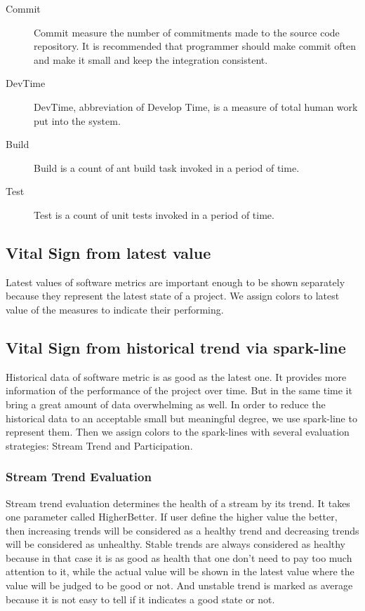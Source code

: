 \begin{description}
\item[Commit] 
Commit measure the number of commitments made to the source code repository. It is recommended that programmer should make commit often and make it small and keep the integration consistent.
\item[DevTime] 
DevTime, abbreviation of Develop Time, is a measure of total human work put into the system.
\item[Build] 
Build is a count of ant build task invoked in a period of time.
\item[Test] 
Test is a count of unit tests invoked in a period of time.
\end{description}

\subsection{Vital Sign from latest value}
Latest values of software metrics are important enough to be shown separately because they represent the latest state of a project. We assign colors to latest value of the measures to indicate their performing.

\subsection{Vital Sign from historical trend via spark-line}
Historical data of software metric is as good as the latest one. It provides more information of the performance of the project over time. But in the same time it bring a great amount of data overwhelming as well. In order to reduce the historical data to an acceptable small but meaningful degree, we use spark-line to represent them. Then we assign colors to the spark-lines with several evaluation strategies: Stream Trend and Participation.

\subsubsection{Stream Trend Evaluation}
Stream trend evaluation determines the health of a stream by its trend. It takes one parameter called HigherBetter. If user define the higher value the better, then increasing trends will be considered as a healthy trend and decreasing trends will be considered as unhealthy. Stable trends are always considered as healthy because in that case it is as good as health that one don't need to pay too much attention to it, while the actual value will be shown in the latest value where the value will be judged to be good or not. And unstable trend is marked as average because it is not easy to tell if it indicates a good state or not. 

